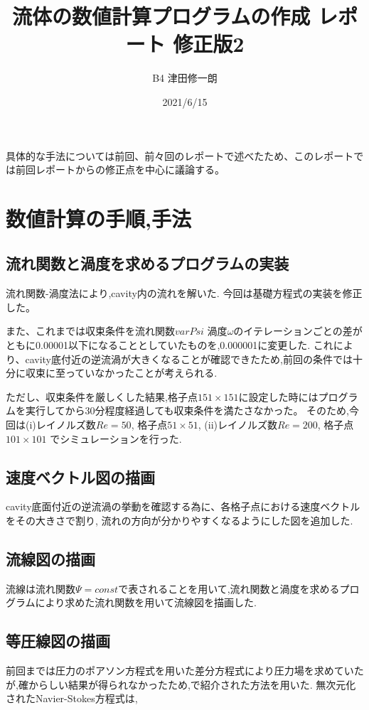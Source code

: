 \documentclass[upLaTeX,a4paper]{jsarticle}
\title{流体の数値計算プログラムの作成 レポート 修正版2}
\author{B4 津田修一朗}
\date{2021/6/15}
\begin{document}
\maketitle

具体的な手法については前回、前々回のレポートで述べたため、このレポートでは前回レポートからの修正点を中心に議論する。

\section{数値計算の手順,手法}
\subsection{流れ関数と渦度を求めるプログラムの実装}
流れ関数-渦度法により,cavity内の流れを解いた.
今回は基礎方程式の実装を修正した。

また、これまでは収束条件を流れ関数$varPsi$ 渦度$\omega$のイテレーションごとの差がともに0.00001以下になることとしていたものを,0.000001に変更した.
これにより、cavity底付近の逆流渦が大きくなることが確認できたため,前回の条件では十分に収束に至っていなかったことが考えられる.

ただし、収束条件を厳しくした結果,格子点$151 × 151$に設定した時にはプログラムを実行してから30分程度経過しても収束条件を満たさなかった。
そのため,今回は(i)レイノルズ数$Re = 50$, 格子点$51\times 51$, (ii)レイノルズ数$Re = 200$, 格子点$101\times 101$
でシミュレーションを行った.

\subsection{速度ベクトル図の描画}
cavity底面付近の逆流渦の挙動を確認する為に、各格子点における速度ベクトルをその大きさで割り,
流れの方向が分かりやすくなるようにした図を追加した.

\subsection{流線図の描画}
流線は流れ関数$\varPsi = const$で表されることを用いて,流れ関数と渦度を求めるプログラムにより求めた流れ関数を用いて流線図を描画した.

\subsection{等圧線図の描画}
前回までは圧力のポアソン方程式を用いた差分方程式により圧力場を求めていたが,確からしい結果が得られなかったため,\cite{2}で紹介された方法を用いた.
無次元化されたNavier-Stokes方程式は,
\end{document}

